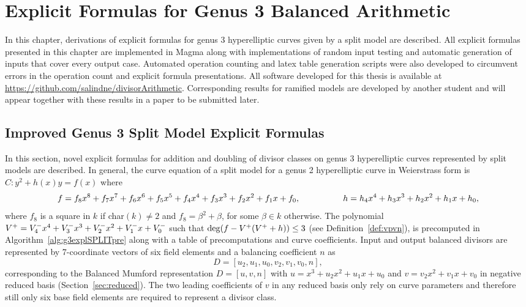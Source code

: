
\chapter{Explicit Formulas for Genus 3 Balanced Arithmetic}\label{cha:g3} In
this chapter, derivations of explicit formulas for genus 3 hyperelliptic curves
given by a split model are described. 
All explicit formulas presented in this chapter are
implemented in Magma along with implementations of random input testing and
automatic generation of inputs that cover every output case. Automated operation
counting and latex table generation scripts were also developed to circumvent
errors in the operation count and explicit formula presentations. All software
developed for this thesis is available at
\url{https://github.com/salindne/divisorArithmetic}. Corresponding results for
ramified models are developed by another student and will appear together with
these results in a paper to be submitted later. 

\section{Improved Genus 3 Split Model Explicit Formulas}
In this section, novel explicit formulas for addition and doubling of divisor
classes on genus 3 hyperelliptic curves represented by split models are
described. In general, the curve equation of a split model for a genus 2
hyperelliptic curve in Weierstrass form is $C: y^2 + h(x)y = f(x)$ where
$$f = f_8x^8 + f_7x^7 + f_6x^6 + f_5x^5 + f_4x^4 + f_3x^3 + f_2 x^2 + f_1x +
f_0, \quad\quad\quad\quad\quad h = h_4x^4 + h_3x^3 + h_2x^2 + h_1x + h_0,$$ where $f_8$ is a
square in $k$ if char$(k) \neq 2$ and $f_8 = \beta^2 + \beta$, for some $\beta
\in k$ otherwise. The polynomial $V^{+} = V^{-}_4x^4 + V^{-}_3x^3 + V^{-}_2x^2 + V^{-}_1x
+ V^{-}_0$ such that $\deg(f - V^{+}(V^{+} + h)) \leq 3$ (see
Definition~\ref{def:vpvn}), is precomputed in Algorithm~\ref{alg:g3explSPLITpre}
along with a table of precomputations and curve coefficients. Input and output
balanced divisors are represented by 7-coordinate vectors of six field elements
and a balancing coefficient $n$ as$$ D = [u_2,u_1,u_0,v_2,v_1,v_0,n],$$
corresponding to the Balanced Mumford representation $D = [u,v,n]$ with $u = x^3
+ u_2x^2 + u_1x + u_0$ and $v = v_2x^2 + v_1x + v_0$ in negative reduced basis
(Section~\ref{sec:reduced}).  The two leading coefficients of $v$ in any reduced
basis only rely on curve parameters and therefore still only six base field
elements are required to represent a divisor class. 

